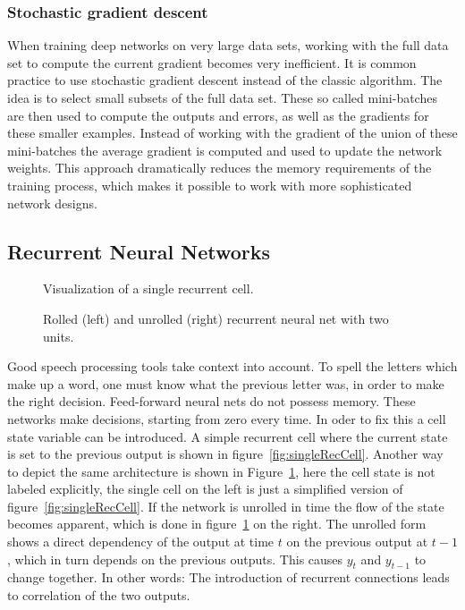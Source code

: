 \subsubsection{Stochastic gradient descent}
When training deep  networks on very large data sets, working with the full data set to compute the current gradient becomes very inefficient. It is common practice to use stochastic gradient descent instead of the classic algorithm. The idea is to select small subsets of the full data set. These so called mini-batches are then used to compute the outputs and errors, as well as the gradients for these smaller examples. Instead of working with the gradient of the union of these mini-batches the average gradient is computed and used to update the network weights. This approach dramatically reduces the memory requirements of the training process, which makes it possible to work with more sophisticated network designs.

\subsection{Recurrent Neural Networks}
\begin{figure}
\centering

\caption{Visualization of a single recurrent cell.}
\label{fig:singleRecCell}

\caption{Rolled (left) and unrolled (right) recurrent neural net with two units.}
\label{fig:unrolledNet}
\end{figure}
Good speech processing tools take context into account. To spell the letters which make up a word, one must know what the previous letter was, in order to make the right decision.
Feed-forward neural nets do not possess memory. These networks make decisions, starting from zero every time. In oder to fix this a cell state variable can be introduced. A simple recurrent cell where the current state is set to the previous output is shown in figure~\ref{fig:singleRecCell}. Another way to depict the same architecture is shown in Figure~\ref{fig:unrolledNet}, here the cell state is not labeled explicitly, the single cell on the left is just a simplified version of figure~\ref{fig:singleRecCell}. If the network is unrolled in time the flow of the state becomes apparent, which is done in figure~\ref{fig:unrolledNet} on the right.
The unrolled form shows a direct dependency of the output at time $t$ on the previous output at $t-1$, which in turn depends on the previous outputs. This causes $y_t$ and $y_{t-1}$ to change together. In other words: The introduction of recurrent connections leads to correlation of the two outputs.


